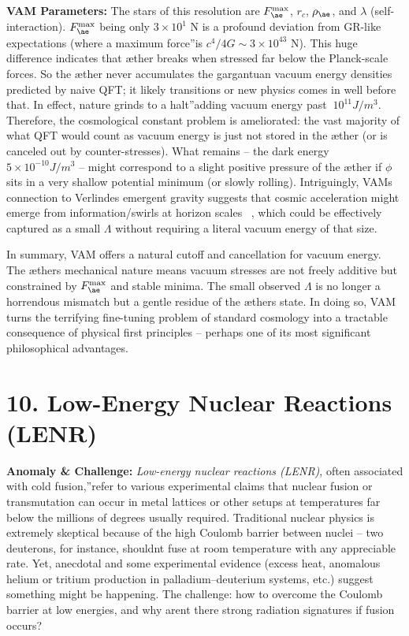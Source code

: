 \documentclass[a4paper, aps,preprint,superscriptaddress, 12pt]{revtex4}
\begin{document}
\textbf{VAM Parameters:} The stars of this resolution are $F_{\ae}^{\max}$, $r_c$, $\rho_{\ae}$, and $\lambda$ (self-interaction). $F_{\ae}^{\max}$ being only $3\times10^1$ N is a profound deviation from GR-like expectations (where a \grqq maximum force\textquotedblright is $c^4/4G \sim 3\times10^{43}$ N). This huge difference indicates that æther breaks when stressed far below the Planck-scale forces. So the æther never accumulates the gargantuan vacuum energy densities predicted by naive QFT; it likely transitions or new physics comes in well before that. In effect, nature \grqq grinds to a halt\textquotedblright adding vacuum energy past $~10^11 J/m^3$. Therefore, the cosmological constant problem is ameliorated: the vast majority of what QFT would count as vacuum energy is just not stored in the æther (or is canceled out by counter-stresses). What remains – the dark energy ~ $5\times10^{-10} J/m^3$ – might correspond to a slight positive pressure of the æther if $\phi$ sits in a very shallow potential minimum (or slowly rolling). Intriguingly, VAM\rqs s connection to Verlinde\rqs s emergent gravity suggests that cosmic acceleration might emerge from information/swirls at horizon scales~\cite{Iskandarani2025c} , which could be effectively captured as a small $\Lambda$ without requiring a literal vacuum energy of that size.


In summary, VAM offers a natural cutoff and cancellation for vacuum energy. The æther\rqs s mechanical nature means vacuum stresses are not freely additive but constrained by $F_{\ae}^{\max}$ and stable minima. The small observed $\Lambda$ is no longer a horrendous mismatch but a gentle residue of the æther\rqs s state. In doing so, VAM turns the terrifying fine-tuning problem of standard cosmology into a tractable consequence of physical first principles – perhaps one of its most significant philosophical advantages.


\section*{10. Low-Energy Nuclear Reactions (LENR)}

\textbf{Anomaly \& Challenge: } \textit{Low-energy nuclear reactions (LENR)}, often associated with \grqq cold fusion,\textquotedblright refer to various experimental claims that nuclear fusion or transmutation can occur in metal lattices or other setups at temperatures far below the millions of degrees usually required. Traditional nuclear physics is extremely skeptical because of the high Coulomb barrier between nuclei – two deuterons, for instance, shouldn\rqs t fuse at room temperature with any appreciable rate. Yet, anecdotal and some experimental evidence (excess heat, anomalous helium or tritium production in palladium–deuterium systems, etc.) suggest something might be happening. The challenge: how to overcome the Coulomb barrier at low energies, and why aren\rqs t there strong radiation signatures if fusion occurs?
\end{document}
